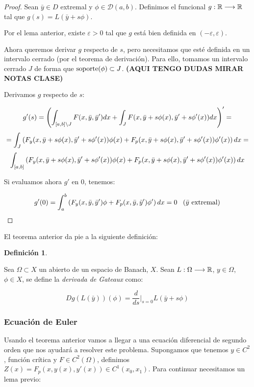 \documentclass[12pt]{article}
\theoremstyle{definition}
\newtheorem{definition}[theorem]{Definición}
\theoremstyle{remark}
\newcommand{\soportecompacto}{\mathcal{D}(a,b)}
\newcommand{\xcerocerrado}{[a,b]}
\begin{document}
\begin{proof}
Sean $\bar{y}\in D$ extremal y $\phi\in\soportecompacto$. Definimos el funcional $g:\mathbb{R}\longrightarrow\mathbb{R}$ tal que $g(s)=L(\bar{y}+s\phi)$.

Por el lema anterior, existe $\varepsilon>0$ tal que $g$ está bien definida en $(-\varepsilon,\varepsilon)$.

Ahora queremos derivar $g$ respecto de $s$, pero necesitamos que esté definida en un intervalo cerrado (por el teorema de derivación). Para ello, tomamos un intervalo cerrado $J$ de forma que $\operatorname{soporte} (\phi)\subset J$. \textbf{(AQUI TENGO DUDAS MIRAR NOTAS CLASE)}

Derivamos $g$ respecto de $s$:

\[
g'(s)=\left(
\integral{\xcerocerrado\backslash J}{}{F(x,\bar{y},\bar{y}')dx}+
\integral{J}{}{F(x,\bar{y}+s\phi(x),\bar{y}'+s\phi'(x))dx}
\right)'=
\]
\[
= \displaystyle\int_{ J }^{  } \left(F_y(x,\bar{y}+s\phi(x),\bar{y}'+s\phi'(x))\phi(x)+F_p(x,\bar{y}+s\phi(x),\bar{y}'+s\phi'(x))\phi'(x)\right)dx=
\]
\[
\integral{\xcerocerrado}{}{\left(F_y(x,\bar{y}+s\phi(x),\bar{y}'+s\phi'(x))\phi(x)+F_p(x,\bar{y}+s\phi(x),\bar{y}'+s\phi'(x))\phi'(x)\right)dx}
\]

Si evaluamos ahora $g'$ en 0, tenemos:

\[
g'(0)=\displaystyle\int_{ a }^{ b } \left(F_y(x,\bar{y},\bar{y}')\phi+F_p(x,\bar{y},\bar{y}')\phi'\right)dx=0 \;\;\;(\bar{y}\text{ extremal})
\]

\end{proof}

El teorema anterior da pie a la siguiente definición:

\begin{definition}
\label{gateaux}

Sea $\Omega\subset X$ un abierto de un espacio de Banach, $X$. Sean $L:\Omega\longrightarrow\mathbb{R}$, $y\in \Omega$, $\phi\in X$, se define la \textit{derivada de Gateaux} como:

\[
Dg(L(\bar{y}))(\phi)=\frac{d}{ds}\Big|_{s=0}L(\bar{y}+s\phi)
\]

\end{definition}

\subsubsection{Ecuación de Euler}

Usando el teorema anterior vamos a llegar a una ecuación diferencial de segundo orden que nos ayudará a resolver este problema. Supongamos que tenemos $y\in C^2$, función crítica y $F\in C^2(\Omega)$, definimos $Z(x)=F_p(x,y(x),y'(x))\in C^1(x_0,x_1)$. Para continuar necesitamos un lema previo:
\end{document}
